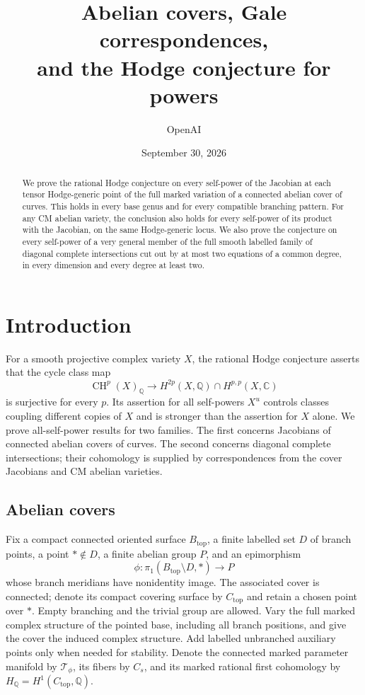 \documentclass[11pt]{article}
\title{Abelian covers, Gale correspondences,\\
and the Hodge conjecture for powers}
\author{OpenAI}
\date{September 30, 2026}
\newcommand{\Q}{\mathbb Q}
\newcommand{\C}{\mathbb C}
\newcommand{\CH}{\operatorname{CH}}
\theoremstyle{plain}
\theoremstyle{definition}
\theoremstyle{remark}
\numberwithin{equation}{section}
\begin{document}
\maketitle

\begin{abstract}
We prove the rational Hodge conjecture on every self-power of the
Jacobian at each tensor Hodge-generic point of the full marked variation
of a connected abelian cover of curves.  This holds in every base genus
and for every compatible branching pattern.  For any CM abelian variety,
the conclusion also holds for every self-power of its product with the
Jacobian, on the same Hodge-generic locus.
We also prove the conjecture on every self-power of a very general
member of the full smooth labelled family of diagonal complete
intersections cut out by at most two equations of a common degree, in
every dimension and every degree at least two.
\end{abstract}

\tableofcontents

\section{Introduction}

For a smooth projective complex variety \(X\), the rational Hodge
conjecture asserts that the cycle class map
\[
 \CH^p(X)_\Q\longrightarrow
 H^{2p}(X,\Q)\cap H^{p,p}(X,\C)
\]
is surjective for every \(p\).  Its assertion for all self-powers
\(X^u\) controls classes coupling different copies of \(X\) and is
stronger than the assertion for \(X\) alone.  We prove all-self-power
results for two families.  The first concerns Jacobians of connected
abelian covers of curves.  The second concerns diagonal complete
intersections; their cohomology is supplied by correspondences from
the cover Jacobians and CM abelian varieties.

\subsection{Abelian covers}

Fix a compact connected oriented surface \(B_{\mathrm{top}}\), a finite
labelled set \(D\) of branch points, a point \(*\notin D\), a finite
abelian group \(P\), and an epimorphism
\[
 \phi:\pi_1(B_{\mathrm{top}}\setminus D,*)\longrightarrow P
\]
whose branch meridians have nonidentity image.  The associated cover is
connected; denote its compact covering surface by \(C_{\mathrm{top}}\)
and retain a chosen point over \(*\).  Empty branching and the
trivial group are allowed.  Vary the full marked complex structure of
the pointed base, including all branch positions, and give the cover
the induced complex structure.  Add labelled unbranched auxiliary
points only when needed for stability.  Denote the connected marked
parameter manifold by \(\mathcal T_\phi\), its fibers by \(C_s\), and its marked
rational first cohomology by
\(H_\Q=H^1(C_{\mathrm{top}},\Q)\).
\end{document}
